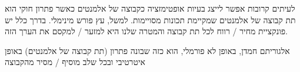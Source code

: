 לעיתים קרובות אפשר לייצג בעיות אופטימזציה כקבוצה של אלמנטים כאשר פתרון חוקי הוא תת קבוצה של 
אלמנטים שמקיימת תכונות מסויימות. 
למשל, עץ פורש מינימלי.
בדרך כלל יש פונקציית מחיר / רווח לכל תת קבוצה והמטרה שלנו היא למזער / למקסם את הערך הזה.

אלגוריתם חמדן, באופן לא פורמלי, הוא כזה שבונה פתרון (תת קבוצה של אלמנטים) באופן איטרטיבי ובכל
שלב מוסיף / מסיר מהקבוצה 
